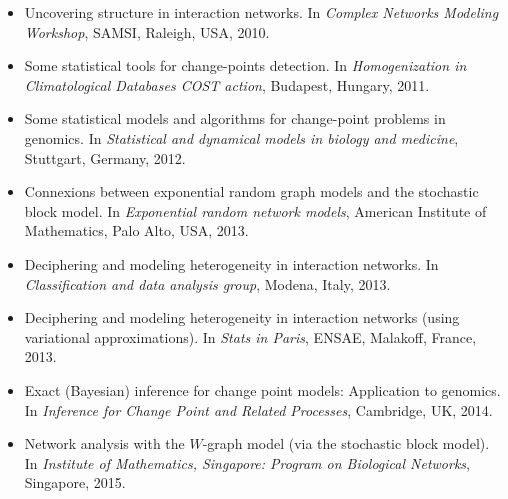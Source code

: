 \begin{itemize}

\item
\newblock Uncovering structure in interaction networks.
\newblock In {\em Complex Networks Modeling Workshop}, SAMSI, Raleigh, USA,
  2010.

\item
\newblock Some statistical tools for change-points detection.
\newblock In {\em Homogenization in Climatological Databases {COST} action},
  Budapest, Hungary, 2011.

\item
\newblock Some statistical models and algorithms for change-point problems in
  genomics.
\newblock In {\em Statistical and dynamical models in biology and medicine},
  Stuttgart, Germany, 2012.

\item
\newblock Connexions between exponential random graph models and the stochastic
  block model.
\newblock In {\em Exponential random network models}, American Institute of
  Mathematics, Palo Alto, USA, 2013.

\item
\newblock Deciphering and modeling heterogeneity in interaction networks.
\newblock In {\em Classification and data analysis group}, Modena, Italy, 2013.

\item
\newblock Deciphering and modeling heterogeneity in interaction networks (using
  variational approximations).
\newblock In {\em Stats in {P}aris}, ENSAE, Malakoff, France, 2013.

\item
\newblock Exact ({B}ayesian) inference for change point models: {A}pplication
  to genomics.
\newblock In {\em Inference for Change Point and Related Processes}, Cambridge,
  {UK}, 2014.

\item
\newblock Network analysis with the {$W$}-graph model (via the stochastic block
  model).
\newblock In {\em Institute of Mathematics, Singapore: Program on Biological
  Networks}, Singapore, 2015.

\end{itemize}

